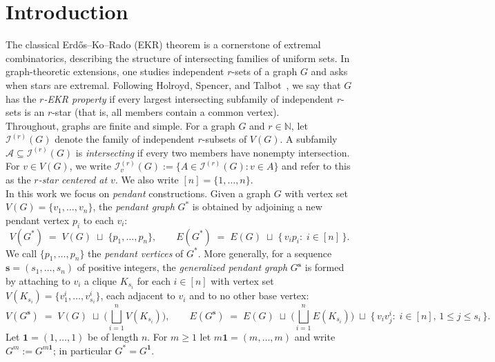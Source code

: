 \documentclass{article}
\theoremstyle{definition}
\newcommand{\A}{\mathcal{A}}
\newcommand{\s}{\mathbf{s}}
\newcommand{\1}{\mathbf{1}}
\newcommand{\vi}{v^i}
\newcommand{\ir}{\mathcal{I}^{(r)}}
\begin{document}

\section{Introduction}

The classical Erd\H{o}s--Ko--Rado (EKR) theorem is a cornerstone of extremal combinatorics, describing the structure of intersecting families of uniform sets. In graph-theoretic extensions, one studies independent $r$-sets of a graph $G$ and asks when stars are extremal. Following Holroyd, Spencer, and Talbot~\cite{Holroyd2005}, we say that $G$ has the \emph{$r$-EKR property} if every largest intersecting subfamily of independent $r$-sets is an $r$-star (that is, all members contain a common vertex).\\

\noindent Throughout, graphs are finite and simple. For a graph $G$ and $r\in\mathbb{N}$, let $\ir(G)$ denote the family of independent $r$-subsets of $V(G)$. A subfamily $\A\subseteq\ir(G)$ is \emph{intersecting} if every two members have nonempty intersection. For $v\in V(G)$, we write $\ir_v(G):=\{A\in\ir(G):v\in A\}$ and refer to this as the \emph{$r$-star centered at $v$}. We also write $[n]=\{1,\dots,n\}$. \\

\noindent In this work we focus on \emph{pendant} constructions. Given a graph $G$ with vertex set $V(G)=\{v_1,\dots,v_n\}$, the \emph{pendant graph} $G^*$ is obtained by adjoining a new pendant vertex $p_i$ to each $v_i$:
\[
V(G^*) \;=\; V(G)\;\sqcup\;\{p_1,\dots,p_n\},
\qquad
E(G^*) \;=\; E(G)\;\sqcup\;\{\,v_ip_i:\;i\in [n]\,\}.
\]
We call $\{p_1,\dots,p_n\}$ the \emph{pendant vertices} of $G^*$. More generally, for a sequence $\s=(s_1,\dots,s_n)$ of positive integers, the \emph{generalized pendant graph} $G^{\s}$ is formed by attaching to $v_i$ a clique $K_{s_i}$ for each $i \in [n]$ with vertex set $V(K_{s_i})=\{\vi_1,\dots,\vi_{s_i}\}$, each adjacent to $v_i$ and to no other base vertex:
\[
V(G^{\s}) \;=\; V(G)\;\sqcup\; \bigl(\bigsqcup_{i=1}^n V(K_{s_i})\bigr),\qquad
E(G^{\s}) \;=\; E(G)\;\sqcup\;\bigl(\bigsqcup_{i=1}^n E(K_{s_i})\bigr)\;\sqcup\;\{\,v_i\vi_j:\; i\in[n],\,1\le j\le s_i\,\}.
\]
Let $\mathbf{1}=(1, \ldots, 1)$ be of length $n$. For $m\ge 1$ let $m\mathbf{1}=(m,\dots,m)$ and write $G^m:=G^{m\mathbf{1}}$; in particular $G^*=G^{\mathbf{1}}$. \\
\end{document}
